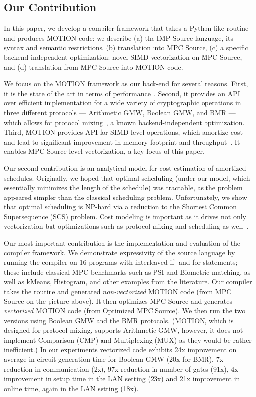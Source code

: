 \subsection{Our Contribution} In this paper, we develop a compiler framework that takes a Python-like routine and produces MOTION code: we describe (a) the IMP Source language, its syntax and semantic restrictions, (b) translation into MPC Source, (c) a specific backend-independent optimization: novel SIMD-vectorization on MPC Source, and (d) translation from MPC Source into MOTION code. %

We focus on the MOTION framework as our back-end for several reasons. First, it is the state of the art in terms of performance~\cite{Braun:2022}. Second, it provides an API over efficient implementation for a wide variety of cryptographic operations in three different protocols ---  Arithmetic GMW, Boolean GMW, and BMR --- which allows for protocol mixing~\cite{Buscher:2018b,Ishaq:2019, Fang:2022}, a known backend-independent optimization. Third, MOTION provides API for SIMD-level operations, which amortize cost and lead to significant improvement in memory footprint and
throughput~\cite{Demmler:2015, Araki:2018, Braun:2022}. It enables MPC Source-level vectorization, a key focus of this paper.

Our second contribution is an analytical model for cost estimation of amortized schedules. Originally, we hoped that optimal scheduling (under our model, which essentially minimizes the length of the schedule) was tractable, as the problem appeared simpler than the classical scheduling problem. Unfortunately, we show that optimal scheduling is NP-hard via a reduction to the Shortest Common Supersequence (SCS) problem. Cost modeling is important as it drives not only vectorization but optimizations such as protocol mixing and scheduling as well~\cite{Buscher:2018b}.

Our most important contribution is the implementation and evaluation of the compiler framework. 
We demonstrate expressivity of the source language by running the compiler on 16 programs with interleaved if- and for-statements; these include classical MPC benchmarks such as PSI and Biometric matching, as well as kMeans, Histogram, and other examples from the literature. 
Our compiler takes the routine and generated \emph{non-vectorized} MOTION code (from MPC Source on the picture above). It then optimizes MPC Source and generates 
\emph{vectorized} MOTION code (from Optimized MPC Source). We then run the two versions using Boolean GMW and the BMR protocols. (MOTION, which is designed for 
protocol mixing, supports Arithmetic GMW, however, it does not implement Comparison (CMP) and Multiplexing (MUX) as they would be rather inefficient.)
In our experiments vectorized code exhibits 24x improvement on average in circuit generation time for Boolean GMW (20x for BMR), 7x reduction 
in communication (2x), 97x reduction in number of gates (91x), 4x improvement in setup time in the LAN setting (23x) and 21x improvement in online time, again in the LAN setting (18x).

